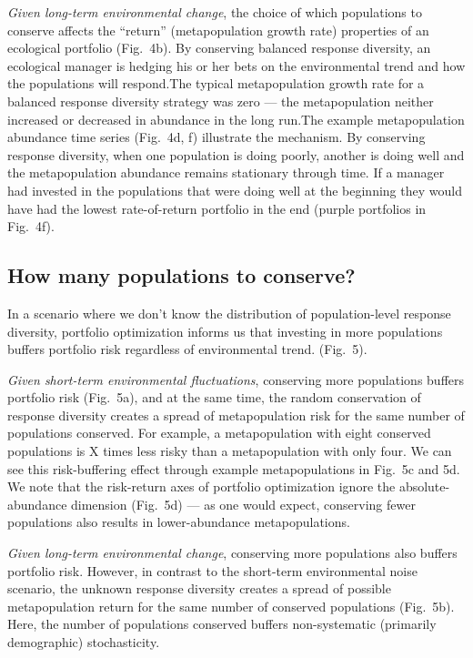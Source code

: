 \emph{Given long-term environmental change}, the choice of which populations to conserve affects the ``return'' (metapopulation growth rate) properties of an ecological portfolio (Fig.~4b). By conserving balanced response diversity, an ecological manager is hedging his or her bets on the environmental trend and how the populations will respond.The typical metapopulation growth rate for a balanced response diversity strategy was zero --- the metapopulation neither increased or decreased in abundance in the long run.The example metapopulation abundance time series (Fig.~4d, f) illustrate the mechanism. By conserving response diversity, when one population is doing poorly, another is doing well and the metapopulation abundance remains stationary through time. If a manager had invested in the populations that were doing well at the beginning they would have had the lowest rate-of-return portfolio in the end (purple portfolios in Fig.~4f).

\subsection{How many populations to conserve?}

In a scenario where we don't know the distribution of population-level response diversity, portfolio optimization informs us that investing in more populations buffers portfolio risk regardless of environmental trend. (Fig.~5).

\emph{Given short-term environmental fluctuations}, conserving more populations buffers portfolio risk (Fig.~5a), and at the same time, the random conservation of response diversity creates a spread of metapopulation risk for the same number of populations conserved. For example, a metapopulation with eight conserved populations is X times less risky than a metapopulation with only four. We can see this risk-buffering effect through example metapopulations in Fig.~5c and 5d. We note that the risk-return axes of portfolio optimization ignore the absolute-abundance dimension (Fig.~5d) --- as one would expect, conserving fewer populations also results in lower-abundance metapopulations.

\emph{Given long-term environmental change}, conserving more populations also buffers portfolio risk. However, in contrast to the short-term environmental noise scenario, the unknown response diversity creates a spread of possible metapopulation return for the same number of conserved populations (Fig.~5b). Here, the number of populations conserved buffers non-systematic (primarily demographic) stochasticity.

